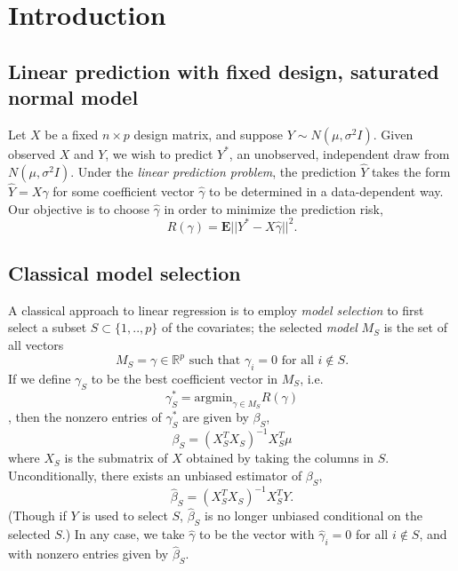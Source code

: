 \documentclass[12pt]{article}
\begin{document}
\maketitle

\newcommand{\tr}{\text{tr}}
\newcommand{\E}{\textbf{E}}
\newcommand{\diag}{\text{diag}}
\newcommand{\argmax}{\text{argmax}}
\newcommand{\Cov}{\text{Cov}}
\newcommand{\Var}{\text{Var}}
\newcommand{\argmin}{\text{argmin}}
\newcommand{\Vol}{\text{Vol}}
\newcommand{\comm}[1]{}

\newcommand{\bx}{\boldsymbol{x}}
\newcommand{\by}{\boldsymbol{y}}
\newcommand{\bX}{\boldsymbol{X}}
\newcommand{\bY}{\boldsymbol{Y}}


\section{Introduction}

\subsection{Linear prediction with fixed design, saturated normal model}

Let $X$ be a fixed $n \times p$ design matrix, and suppose $Y \sim
N(\mu, \sigma^2 I)$.  Given observed $X$ and $Y$, we wish to predict
$Y^*$, an unobserved, independent draw from $N(\mu, \sigma^2 I)$.
Under the \emph{linear prediction problem}, the prediction $\hat{Y}$
takes the form $\hat{Y} = X\gamma$ for some coefficient vector
$\hat{\gamma}$ to be determined in a data-dependent way.  Our objective is
to choose $\hat{\gamma}$ in order to minimize the prediction risk,
$$
R(\gamma) = \E||Y^* - X\hat{\gamma}||^2.
$$

\subsection{Classical model selection}

A classical approach to linear regression is to employ \emph{model
selection} to first select a subset $S \subset \{1,..,p\}$ of the
covariates; the selected \emph{model} $M_S$ is the set of all vectors
$$
M_S = \gamma\in \mathbb{R}^p\text{ such that }\gamma_i = 0\text{ for all }i \notin S.
$$  
If we define $\gamma_S$ to be the best coefficient vector in $M_S$, i.e.
$$\gamma_S^* = \argmin_{\gamma \in M_S} R(\gamma)$$,
then the nonzero entries of $\gamma_S^*$ are given by $\beta_S$,
$$
\beta_S = (X_S^T X_S)^{-1} X_S^T \mu
$$
where $X_S$ is the submatrix of $X$ obtained by taking the columns in $S$.
Unconditionally, there exists an unbiased estimator of $\beta_S$,
$$
\hat{\beta}_S = (X_S^T X_S)^{-1} X_S^T Y.
$$
(Though if $Y$ is used to select $S$, $\hat{\beta}_S$ is no longer
unbiased conditional on the selected $S$.)  In any case, we take
$\hat{\gamma}$ to be the vector with $\hat{\gamma}_i = 0$ for all
$i \notin S$, and with nonzero entries given by $\hat{\beta}_S$.
\end{document}
